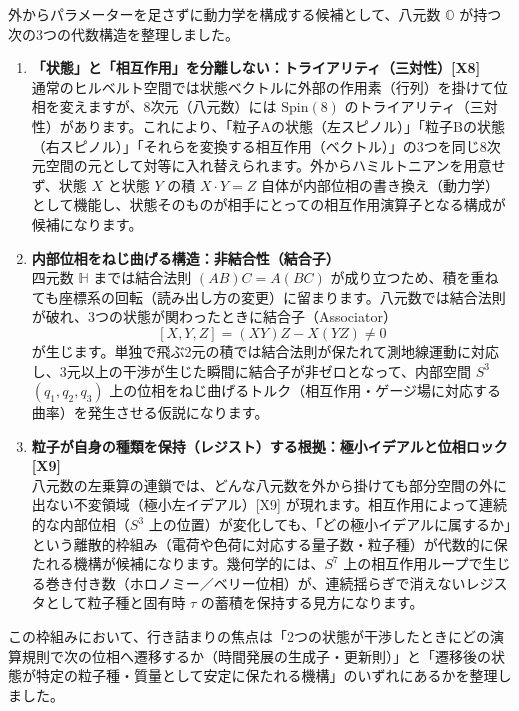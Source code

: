 \documentclass[
  a4paper,
]{ltjsarticle}
\begin{document}
外からパラメーターを足さずに動力学を構成する候補として、八元数
\(\mathbb{O}\) が持つ次の3つの代数構造を整理しました。

\begin{enumerate}
\def\labelenumi{\arabic{enumi}.}
\item
  \textbf{「状態」と「相互作用」を分離しない：トライアリティ（三対性）{[}X8{]}}\\
  通常のヒルベルト空間では状態ベクトルに外部の作用素（行列）を掛けて位相を変えますが、8次元（八元数）には
  \(\mathrm{Spin}(8)\)
  のトライアリティ（三対性）があります。これにより、「粒子Aの状態（左スピノル）」「粒子Bの状態（右スピノル）」「それらを変換する相互作用（ベクトル）」の3つを同じ8次元空間の元として対等に入れ替えられます。外からハミルトニアンを用意せず、状態
  \(X\) と状態 \(Y\) の積 \(X \cdot Y = Z\)
  自体が内部位相の書き換え（動力学）として機能し、状態そのものが相手にとっての相互作用演算子となる構成が候補になります。
\item
  \textbf{内部位相をねじ曲げる構造：非結合性（結合子）}\\
  四元数 \(\mathbb{H}\) までは結合法則 \((AB)C = A(BC)\)
  が成り立つため、積を重ねても座標系の回転（読み出し方の変更）に留まります。八元数では結合法則が破れ、3つの状態が関わったときに結合子（Associator）
  \[[X, Y, Z] = (XY)Z - X(YZ) \neq 0\]
  が生じます。単独で飛ぶ2元の積では結合法則が保たれて測地線運動に対応し、3元以上の干渉が生じた瞬間に結合子が非ゼロとなって、内部空間
  \(S^3\) \((q_1, q_2, q_3)\)
  上の位相をねじ曲げるトルク（相互作用・ゲージ場に対応する曲率）を発生させる仮説になります。
\item
  \textbf{粒子が自身の種類を保持（レジスト）する根拠：極小イデアルと位相ロック
  {[}X9{]}}\\
  八元数の左乗算の連鎖では、どんな八元数を外から掛けても部分空間の外に出ない不変領域（極小左イデアル）{[}X9{]}
  が現れます。相互作用によって連続的な内部位相（\(S^3\)
  上の位置）が変化しても、「どの極小イデアルに属するか」という離散的枠組み（電荷や色荷に対応する量子数・粒子種）が代数的に保たれる機構が候補になります。幾何学的には、\(S^7\)
  上の相互作用ループで生じる巻き付き数（ホロノミー／ベリー位相）が、連続揺らぎで消えないレジスタとして粒子種と固有時
  \(\tau\) の蓄積を保持する見方になります。
\end{enumerate}

この枠組みにおいて、行き詰まりの焦点は「2つの状態が干渉したときにどの演算規則で次の位相へ遷移するか（時間発展の生成子・更新則）」と「遷移後の状態が特定の粒子種・質量として安定に保たれる機構」のいずれにあるかを整理しました。
\end{document}
